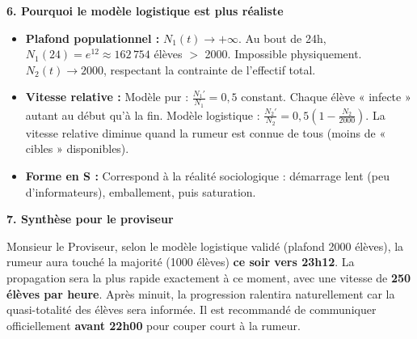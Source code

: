 \documentclass[11pt]{article}
\begin{document}
\begin{exoresolu}
\medskip
\noindent \textbf{6. Pourquoi le modèle logistique est plus réaliste}
\begin{itemize}
    \item \textbf{Plafond populationnel :} $N_1(t) \to +\infty$. Au bout de 24h, $N_1(24) = e^{12} \approx 162\,754$ élèves $>$ 2000. Impossible physiquement. $N_2(t) \to 2000$, respectant la contrainte de l'effectif total.
    \item \textbf{Vitesse relative :} Modèle pur : $\frac{N_1'}{N_1} = 0,5$ constant. Chaque élève « infecte » autant au début qu'à la fin. Modèle logistique : $\frac{N_2'}{N_2} = 0,5 \left(1 - \frac{N_2}{2000}\right)$. La vitesse relative diminue quand la rumeur est connue de tous (moins de « cibles » disponibles).
    \item \textbf{Forme en S :} Correspond à la réalité sociologique : démarrage lent (peu d'informateurs), emballement, puis saturation.
\end{itemize}

\medskip
\noindent \textbf{7. Synthèse pour le proviseur}
\begin{aretenir}
Monsieur le Proviseur, selon le modèle logistique validé (plafond 2000 élèves), la rumeur aura touché la majorité (1000 élèves) \textbf{ce soir vers 23h12}. La propagation sera la plus rapide exactement à ce moment, avec une vitesse de \textbf{250 élèves par heure}. Après minuit, la progression ralentira naturellement car la quasi-totalité des élèves sera informée. Il est recommandé de communiquer officiellement \textbf{avant 22h00} pour couper court à la rumeur.
\end{aretenir}


\end{exoresolu}
\end{document}

